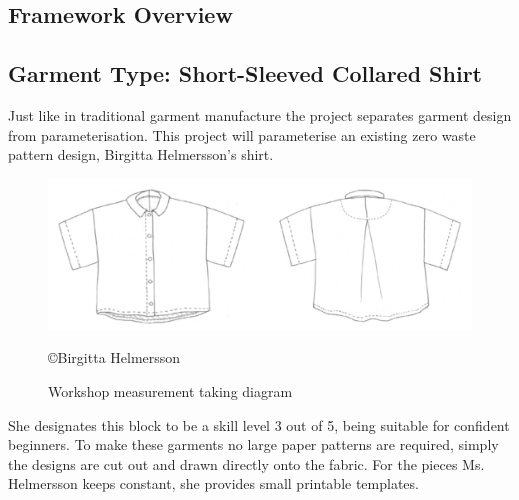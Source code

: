 \subsection{Framework Overview}

\subsection{Garment Type: Short-Sleeved Collared Shirt}
Just like in traditional garment manufacture the project separates garment design from parameterisation. This project will parameterise an existing zero waste pattern design, Birgitta Helmersson’s shirt.

\begin{figure} [H] %
    \centering %
    \includegraphics[width = \textwidth]{Images/finishedgarmentsilhoutte.png} %
    \caption{Workshop measurement taking diagram}
    \copyright {Birgitta Helmersson} %
    \label{} %
\end{figure}
She designates this block to be a skill level 3 out of 5, being suitable for confident beginners. To make these garments no large paper patterns are required, simply the designs are cut out and drawn directly onto the fabric. For the pieces Ms. Helmersson keeps constant, she provides small printable templates.

